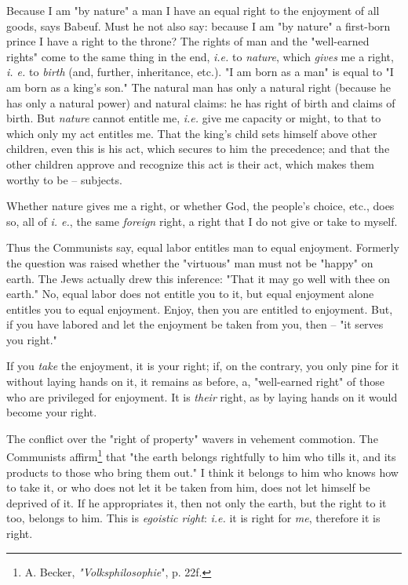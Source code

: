 Because I am "{}by nature"{} a man I have an equal right to the enjoyment of 
all goods, says Babeuf. Must he not also say: because I am "{}by nature"{} a 
first-born prince I have a right to the throne? The rights of man and the 
"{}well-earned rights"{} come to the same thing in the end, \textit{i.e.} to 
\textit{nature}, which \textit{gives} me a right, \textit{i. e.} to 
\textit{birth} (and, further, inheritance, etc.). "{}I am born as a man"{} is 
equal to "{}I am born as a king's son."{} The natural man has only a natural 
right (because he has only a natural power) and natural claims: he has right 
of birth and claims of birth. But \textit{nature} cannot entitle me, 
\textit{i.e.} give me capacity or might, to that to which only my act entitles 
me. That the king's child sets himself above other children, even this is his 
act, which secures to him the precedence; and that the other children approve 
and recognize this act is their act, which makes them worthy to be -- 
subjects.

Whether nature gives me a right, or whether God, the people's choice, etc., 
does so, all of \textit{i. e.}, the same \textit{foreign} right, a right that 
I do not give or take to myself.

Thus the Communists say, equal labor entitles man to equal enjoyment. Formerly 
the question was raised whether the "{}virtuous"{} man must not be "{}happy"{} 
on earth. The Jews actually drew this inference: "{}That it may go well with 
thee on earth."{} No, equal labor does not entitle you to it, but equal 
enjoyment alone entitles you to equal enjoyment. Enjoy, then you are entitled 
to enjoyment. But, if you have labored and let the enjoyment be taken from 
you, then -- "{}it serves you right."{}

If you \textit{take} the enjoyment, it is your right; if, on the contrary, you 
only pine for it without laying hands on it, it remains as before, a, 
"{}well-earned right"{} of those who are privileged for enjoyment. It is 
\textit{their} right, as by laying hands on it would become your right.

The conflict over the "{}right of property"{} wavers in vehement commotion. 
The Communists affirm\footnote{A. Becker, \textit{"{}Volksphilosophie}"{}, p. 
22f.} that "{}the earth belongs rightfully to him who tills it, and its 
products to those who bring them out."{} I think it belongs to him who knows 
how to take it, or who does not let it be taken from him, does not let himself 
be deprived of it. If he appropriates it, then not only the earth, but the 
right to it too, belongs to him. This is \textit{egoistic right}: 
\textit{i.e.} it is right for \textit{me}, therefore it is right.

